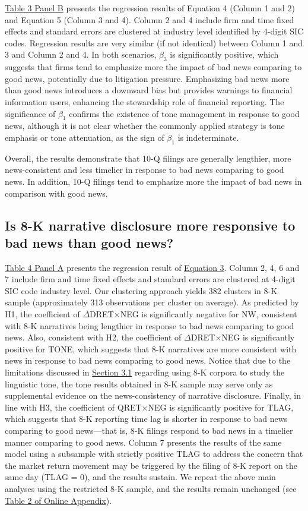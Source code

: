\documentclass[a4paper]{article}
\begin{document}
\begin{spacing}{2}
\hyperref[T3PB]{Table 3 Panel B} presents the regression results of Equation 4 (Column 1 and 2) and Equation 5 (Column 3 and 4). Column 2 and 4 include firm and time fixed effects and standard errors are clustered at industry level identified by 4-digit SIC codes. Regression results are very similar (if not identical) between Column 1 and 3 and Column 2 and 4. In both scenarios, $\beta_3$ is significantly positive, which suggests that firms tend to emphasize more the impact of bad news comparing to good news, potentially due to litigation pressure. Emphasizing bad news more than good news introduces a downward bias but provides warnings to financial information users, enhancing the stewardship role of financial reporting. The significance of $\beta_1$ confirms the existence of tone management in response to good news, although it is not clear whether the commonly applied strategy is tone emphasis or tone attenuation, as the sign of $\beta_1$ is indeterminate.

Overall, the results demonstrate that 10-Q filings are generally lengthier, more news-consistent and less timelier in response to bad news comparing to good news. In addition, 10-Q filings tend to emphasize more the impact of bad news in comparison with good news. 

\subsection{Is 8-K narrative disclosure more responsive to bad news than good news?}
\hyperref[T4PA]{Table 4 Panel A} presents the regression result of \hyperref[eq3]{Equation 3}. Column 2, 4, 6 and 7 include firm and time fixed effects and standard errors are clustered at 4-digit SIC code industry level. Our clustering approach yields 382 clusters in 8-K sample (approximately 313 observations per cluster on average). As predicted by H1, the coefficient of $\Delta$DRET$\times$NEG is significantly negative for NW, consistent with 8-K narratives being lengthier in response to bad news comparing to good news. Also, consistent with H2, the coefficient of $\Delta$DRET$\times$NEG is significantly positive for TONE, which suggests that 8-K narratives are more consistent with news in response to bad news comparing to good news. Notice that due to the limitations discussed in \hyperref[sec3.1]{Section 3.1} regarding using 8-K corpora to study the linguistic tone, the tone results obtained in 8-K sample may serve only as supplemental evidence on the news-consistency of narrative disclosure. Finally, in line with H3, the coefficient of QRET$\times$NEG is significantly positive for TLAG, which suggests that 8-K reporting time lag is shorter in response to bad news comparing to good news---that is, 8-K filings respond to bad news in a timelier manner comparing to good news. Column 7 presents the results of the same model using a subsample with strictly positive TLAG to address the concern that the market return movement may be triggered by the filing of 8-K report on the same day (TLAG = 0), and the results sustain. We repeat the above main analyses using the restricted 8-K sample, and the results remain unchanged (see \hyperref[oat2]{Table 2 of Online Appendix}).


\end{spacing}
\end{document}
